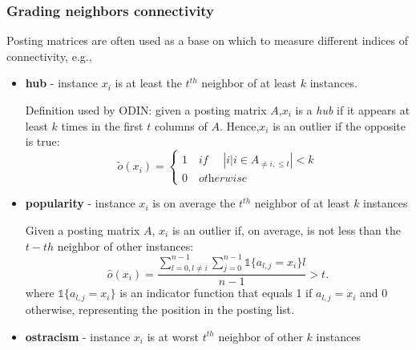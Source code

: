 \subsubsection{Grading neighbors connectivity}
Posting matrices are often used as a base on which
to measure different indices of connectivity, e.g.,
\begin{itemize}
   \item \textbf{hub} - instance $x_i$ is at least the $t^{th}$ neighbor of at least $k$ instances.
   
   Definition used by ODIN: given a posting matrix $A$,$x_i$ is a \textit{hub} if it appears at least $k$ times in the first $t$ columns of $A$. Hence,$x_i$ is an outlier if the opposite is true:
   \[
      \tilde{o}(x_i) = \begin{cases}
         1 \quad\textit{if }\quad |{i|i \in A_{\neq i, \leq t}} | < k\\
         0 \quad\textit{otherwise}
      \end{cases}
   \]
   \item \textbf{popularity} - instance $x_i$ is on average the $t^{th}$ neighbor of at least $k$ instances
   
   Given a posting matrix $A$, $x_i$ is an outlier if, on average, is not less than the $t-th$ neighbor of other instances:
   \[
      \hat{o}(x_i) = \frac{\sum_{l=0, l \neq i}^{n-1} \sum_{j=0}^{n-1} \mathbb{1}\{a_{l,j} = x_i\}l}{n-1} > t.
   \]
   where $\mathbb{1}\{a_{l,j} = x_i\}$ is an indicator function that equals 1 if $a_{l,j} = x_i$ and 0 otherwise, representing the position in the posting list.
   
   \item \textbf{ostracism} - instance $x_i$ is at worst $t^{th}$ neighbor of other $k$ instances
\end{itemize}

